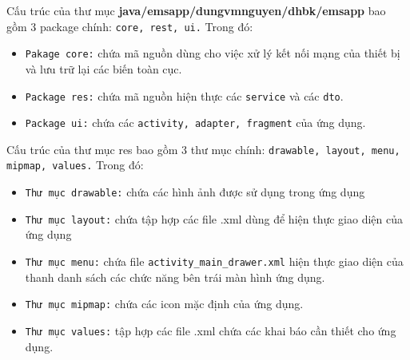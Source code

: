 \documentclass[a4paper]{article}
\begin{document}
Cấu trúc của thư mục \textbf{java/emsapp/dungvmnguyen/dhbk/emsapp} bao gồm 3 package chính: \texttt{core, rest, ui.} Trong đó:
\begin{itemize}
\item \texttt{Pakage core:} chứa mã nguồn dùng cho việc xử lý kết nối mạng của thiết bị và lưu trữ lại các biến toàn cục.
\item \texttt{Package res:} chứa mã nguồn hiện thực các \texttt{service} và các \texttt{dto}.
\item \texttt{Package ui:} chứa các \texttt{activity, adapter, fragment} của ứng dụng.
\end{itemize}
Cấu trúc của thư mục res bao gồm 3 thư mục chính: \texttt{drawable, layout, menu, mipmap, values.} Trong đó:
\begin{itemize}
\item \texttt{Thư mục drawable:} chứa các hình ảnh được sử dụng trong ứng dụng
\item \texttt{Thư mục layout:} chứa tập hợp các file .xml dùng để hiện thực giao diện của ứng dụng
\item \texttt{Thư mục menu:} chứa file \texttt{activity\_main\_drawer.xml} hiện thực giao diện của thanh danh sách các chức năng bên trái màn hình ứng dụng.
\item \texttt{Thư mục mipmap:} chứa các icon mặc định của ứng dụng.
\item \texttt{Thư mục values:} tập hợp các file .xml chứa các khai báo cần thiết cho ứng dụng.
\end{itemize}
\end{document}
